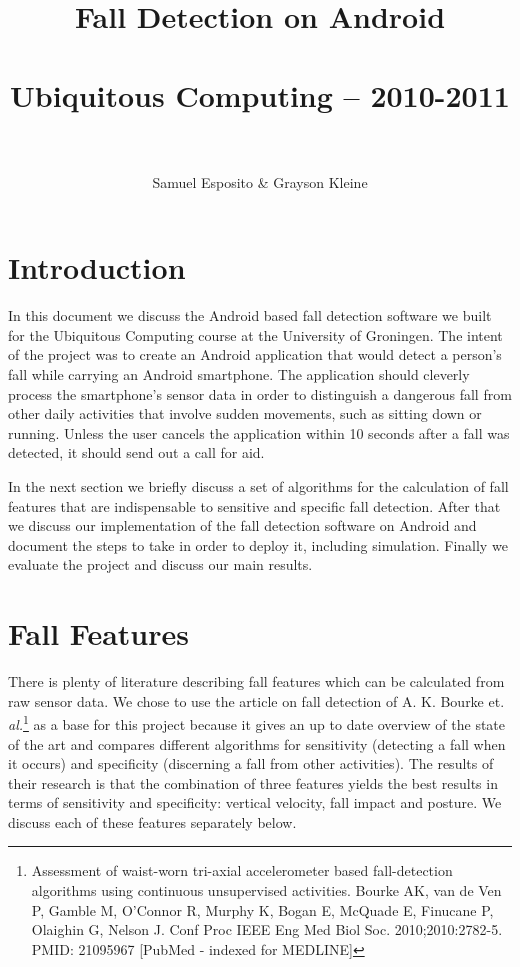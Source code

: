 \documentclass[a4paper, 10pt]{article}
\title{Fall Detection on Android\\~\\Ubiquitous Computing -- 2010-2011\\~}
\author{Samuel Esposito \& Grayson Kleine}
\date{}
\begin{document}
\ifpdf
{}
\else
{}
\fi

\maketitle

\section{Introduction}
In this document we discuss the Android based fall detection software we built for the Ubiquitous Computing course at the University of Groningen. The intent of the project was to create an Android application that would detect a person's fall while carrying an Android smartphone. The application should cleverly process the smartphone's sensor data in order to distinguish a dangerous fall from other daily activities that involve sudden movements, such as sitting down or running. Unless the user cancels the application within 10 seconds after a fall was detected, it should send out a call for aid.

In the next section we briefly discuss a set of algorithms for the calculation of fall features that are indispensable to sensitive and specific fall detection. After that we discuss our implementation of the fall detection software on Android and document the steps to take in order to deploy it, including simulation. Finally we evaluate the project and discuss our main results.

\section{Fall Features}
There is plenty of literature describing fall features which can be calculated from raw sensor data. We chose to use the article on fall detection of A. K. Bourke et. \textit{al.}\footnote{Assessment of waist-worn tri-axial accelerometer based fall-detection algorithms using continuous unsupervised activities. Bourke AK, van de Ven P, Gamble M, O'Connor R, Murphy K, Bogan E, McQuade E, Finucane P, Olaighin G, Nelson J. Conf Proc IEEE Eng Med Biol Soc. 2010;2010:2782-5. PMID: 21095967 [PubMed - indexed for MEDLINE]} as a base for this project because it gives an up to date overview of the state of the art and compares different algorithms for sensitivity (detecting a fall when it occurs) and specificity (discerning a fall from other activities). The results of their research is that the combination of three features yields the best results in terms of sensitivity and specificity: vertical velocity, fall impact and posture. We discuss each of these features separately below.
\end{document}
